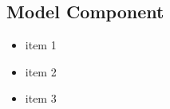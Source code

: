\subsection{Model Component}
\begin{frame}
	\begin{itemize}
		\item item 1
		\item item 2
		\item item 3
	\end{itemize}
\end{frame}
